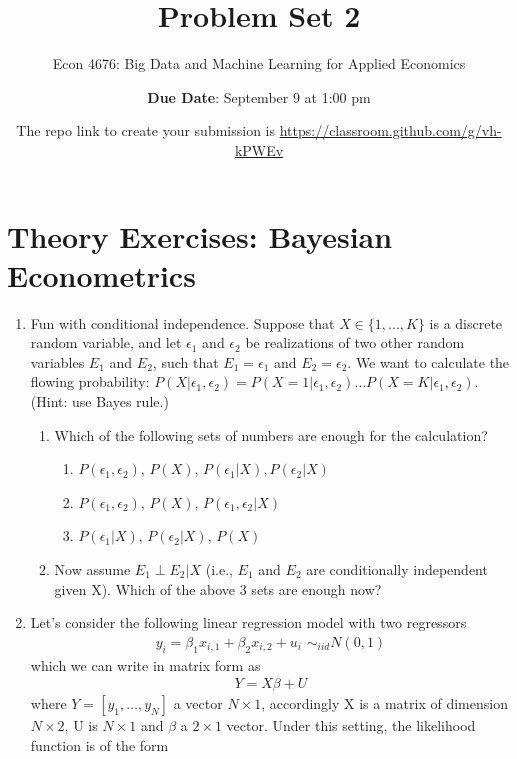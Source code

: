 \documentclass[12pt,onecolumn]{article}
\title{Problem Set 2}
\subtitle{Econ 4676: Big Data and Machine Learning for Applied Economics}
\author{{\bf Due Date}: September 9 at 1:00 pm}
\date{}
\date{The repo link to create your submission is \url{https://classroom.github.com/g/vh-kPWEv}}
\begin{document}
\maketitle

\section{Theory Exercises: Bayesian Econometrics}

\begin{enumerate}

\item Fun with conditional independence.  Suppose that $X\in \{1,...,K\} $ is a discrete random variable, and let $\epsilon_1$ and $\epsilon_2$ be realizations of two other random variables $E_1$ and $E_2$, such that $E_1=\epsilon_1$ and $E_2=\epsilon_2$. We want to calculate the flowing probability: $P(X|\epsilon_1,\epsilon_2)= P(X=1|\epsilon_1,\epsilon_2)\dots  P(X=K|\epsilon_1,\epsilon_2)$. (Hint: use Bayes rule.)
  \begin{enumerate}
  \item Which of the following sets of numbers are enough for the calculation?
  \begin{enumerate}
    \item $P(\epsilon_1,\epsilon_2)$, $P(X)$, $P(\epsilon_1|X), P(\epsilon_2|X)$
    \item $P(\epsilon_1,\epsilon_2)$, $P(X)$, $P(\epsilon_1,\epsilon_2|X)$ 
    \item $P(\epsilon_1|X)$, $P(\epsilon_2|X)$, $P(X)$
    \end{enumerate}
    \item Now  assume $E_1 \perp E_2|X$ (i.e., $E_1$ and $E_2$ are conditionally independent given X). Which of the above 3 sets are enough now?
  \end{enumerate}



  \item Let's consider the following linear regression model with two regressors 
  \begin{align}\label{eq:model}
  y_i = \beta_1 x_{i,1} +\beta_2 x_{i,2} + u_i \,\, \sim_{iid} N(0,1)
  \end{align}
  which we can write in matrix form as 
  \begin{align}
  Y= X\beta + U
  \end{align}
  where $Y=[y_1,\dots,y_N]$ a vector $N\times1$, accordingly X is a matrix of dimension $N\times2$, U is $N\times1$ and $\beta$ a $2\times1$ vector. Under this setting, the likelihood function is of the form
  

\end{enumerate}
\end{document}
